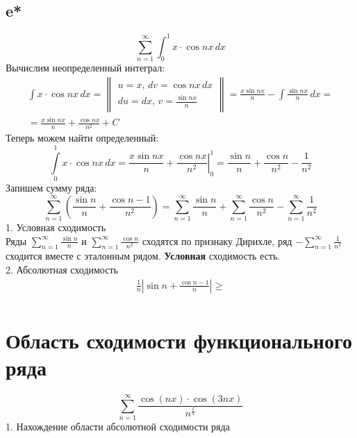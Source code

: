 \documentclass[a5paper, 10pt]{article}
\theoremstyle{definition}
\theoremstyle{plain}
\theoremstyle{remark}
\begin{document}
\subsection{e*}
\begin{equation}
\sum \limits_{n = 1}^{\infty}\int_0^1 x \cdot \cos nx \, dx
\end{equation}
Вычислим неопределенный интеграл:
\begin{multline*}
\int x \cdot \cos nx \, dx =
\begin{Vmatrix}
   u = x, \, dv =  \cos nx \, dx\\
   du = dx, \, v = \frac{\sin nx}{n}
 \end{Vmatrix}
= \frac{x\sin nx}{n} - \int \frac{\sin nx}{n} \, dx =\\ = \frac{x\sin nx}{n} + \frac{\cos nx}{n^2} + C
\end{multline*}
Теперь можем найти определенный:
\begin{equation*}
\int\limits_{0}^{1} x \cdot \cos nx \, dx = \left. \frac{x\sin nx}{n} + \frac{\cos nx}{n^2} \right|_{0}^{1} =
\frac{\sin n}{n} + \frac{\cos n}{n^2} - \frac{1}{n^2}
\end{equation*}
Запишем сумму ряда:
\begin{equation}
\sum \limits_{n = 1}^{\infty} \left(\frac{\sin n}{n} + \frac{\cos n - 1}{n^2} \right) = 
\sum \limits_{n = 1}^{\infty} \frac{\sin n}{n} +\sum \limits_{n = 1}^{\infty}  \frac{\cos n}{n^2} - \sum \limits_{n = 1}^{\infty}  \frac{1}{n^2}
\end{equation}
1. Условная сходимость\\
Ряды $\sum \limits_{n = 1}^{\infty} \frac{\sin n}{n}$ и $\sum \limits_{n = 1}^{\infty}  \frac{\cos n}{n^2}$ сходятся по признаку Дирихле, ряд $-\sum \limits_{n = 1}^{\infty}  \frac{1}{n^2}$ сходится вместе с эталонным рядом. \textbf{Условная} сходимость есть.\\
2. Абсолютная сходимость\\
\begin{multline*}
\frac{1}{n} \left|\sin n + \frac{\cos n - 1}{n} \right| \geq   \\
\end{multline*}



\newpage
\section{Область сходимости функционального ряда}

\begin{equation}
\sum \limits_{n = 1}^{\infty}\frac{\cos( nx) \cdot \cos (3nx) }{n^{\frac{x}{3}}}
\end{equation}
1. Нахождение области абсолютной сходимости ряда\\
\end{document}
